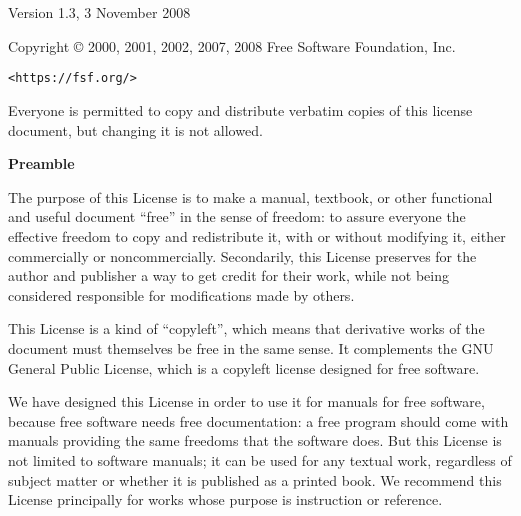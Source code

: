 \documentclass[a4paper,12pt]{book}
\begin{document}
\chapter*{}

 \begin{center}

       Version 1.3, 3 November 2008


 Copyright \copyright{} 2000, 2001, 2002, 2007, 2008  Free Software Foundation, Inc.
 
 \bigskip
 
     \texttt{<https://fsf.org/>}
  
 \bigskip
 
 Everyone is permitted to copy and distribute verbatim copies
 of this license document, but changing it is not allowed.
\end{center}


\begin{center}
{\bf\large Preamble}
\end{center}

The purpose of this License is to make a manual, textbook, or other
functional and useful document ``free'' in the sense of freedom: to
assure everyone the effective freedom to copy and redistribute it,
with or without modifying it, either commercially or noncommercially.
Secondarily, this License preserves for the author and publisher a way
to get credit for their work, while not being considered responsible
for modifications made by others.

This License is a kind of ``copyleft'', which means that derivative
works of the document must themselves be free in the same sense.  It
complements the GNU General Public License, which is a copyleft
license designed for free software.

We have designed this License in order to use it for manuals for free
software, because free software needs free documentation: a free
program should come with manuals providing the same freedoms that the
software does.  But this License is not limited to software manuals;
it can be used for any textual work, regardless of subject matter or
whether it is published as a printed book.  We recommend this License
principally for works whose purpose is instruction or reference.
\end{document}
